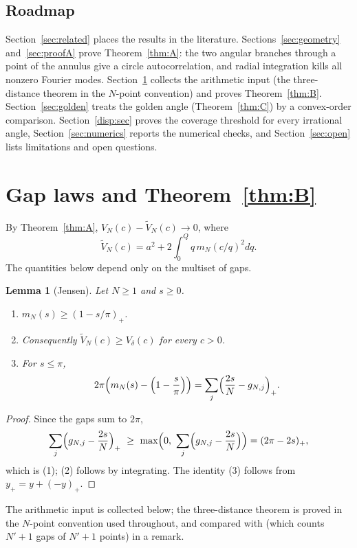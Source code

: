 \documentclass[11pt]{amsart}
\newtheorem{lemma}[theorem]{Lemma}
\theoremstyle{remark}
\newcommand{\Vd}{V_\delta}
\begin{document}
\subsection*{Roadmap}
Section~\ref{sec:related} places the results in the literature. Sections~\ref{sec:geometry} and~\ref{sec:proofA} prove
Theorem~\ref{thm:A}: the two angular branches through a point of the annulus give a
circle autocorrelation, and radial integration kills all nonzero Fourier modes. Section~\ref{sec:gap} collects the
arithmetic input (the three-distance theorem in the $N$-point convention) and proves Theorem~\ref{thm:B}.
Section~\ref{sec:golden} treats the golden angle (Theorem~\ref{thm:C}) by a convex-order comparison.
Section~\ref{disp:sec} proves the coverage threshold for every irrational angle, Section~\ref{sec:numerics}
reports the numerical checks, and Section~\ref{sec:open} lists limitations and open questions.





\section{Gap laws and Theorem~\ref{thm:B}}\label{sec:gap}

By Theorem~\ref{thm:A}, $V_N(c)-\widetilde V_N(c)\to0$, where
\[
\widetilde V_N(c)=a^2+2\int_0^Qq\,m_N(c/q)^2dq .
\]
The quantities below depend only on the multiset of gaps.

\begin{lemma}[Jensen]\label{lem:jensen}
Let $N\ge1$ and $s\ge0$.
\begin{enumerate}
\item $m_N(s)\ge(1-s/\pi)_+$.
\item Consequently $\widetilde V_N(c)\ge\Vd(c)$ for every $c>0$.
\item For $s\le\pi$,
\[
2\pi\Bigl(m_N(s)-\Bigl(1-\frac s\pi\Bigr)\Bigr)=\sum_j\Bigl(\frac{2s}{N}-g_{N,j}\Bigr)_+ .
\]
\end{enumerate}
\end{lemma}

\begin{proof}
Since the gaps sum to $2\pi$,
\[
\sum_j\Bigl(g_{N,j}-\frac{2s}N\Bigr)_+\ \ge\ \max\Bigl(0,\ \sum_j\Bigl(g_{N,j}-\frac{2s}N\Bigr)\Bigr)=(2\pi-2s)_+ ,
\]
which is (1); (2) follows by integrating. The identity (3) follows from $y_+=y+(-y)_+$.
\end{proof}

The arithmetic input is collected below; the three-distance theorem is proved in the
$N$-point convention used throughout, and compared with \cite[Thm.~3]{Leong17} (which counts
$N'+1$ gaps of $N'+1$ points) in a remark.
\end{document}

